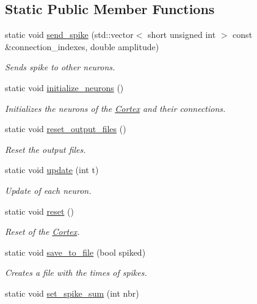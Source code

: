 \subsection*{Static Public Member Functions}
\begin{DoxyCompactItemize}
\item 
static void \hyperlink{class_cortex_a4e5948e42a6ecb67983d235601ae8a61}{send\+\_\+spike} (std\+::vector$<$ short unsigned int $>$ const \&connection\+\_\+indexes, double amplitude)
\begin{DoxyCompactList}\small\item\em Sends spike to other neurons. \end{DoxyCompactList}\item 
static void \hyperlink{class_cortex_a4170f4ee3970170f0390bb484e4639d0}{initialize\+\_\+neurons} ()
\begin{DoxyCompactList}\small\item\em Initializes the neurons of the \hyperlink{class_cortex}{Cortex} and their connections. \end{DoxyCompactList}\item 
static void \hyperlink{class_cortex_ab6d894473b90db185847264480cc3b4d}{reset\+\_\+output\+\_\+files} ()
\begin{DoxyCompactList}\small\item\em Reset the output files. \end{DoxyCompactList}\item 
static void \hyperlink{class_cortex_a9c30099b98098f2dd3b9d2aa215ca619}{update} (int t)
\begin{DoxyCompactList}\small\item\em Update of each neuron. \end{DoxyCompactList}\item 
static void \hyperlink{class_cortex_ac87b3cbab02738737df2f556e147a294}{reset} ()
\begin{DoxyCompactList}\small\item\em Reset of the \hyperlink{class_cortex}{Cortex}. \end{DoxyCompactList}\item 
static void \hyperlink{class_cortex_acb97b9bb95b16d0dd055c94d540e1983}{save\+\_\+to\+\_\+file} (bool spiked)
\begin{DoxyCompactList}\small\item\em Creates a file with the times of spikes. \end{DoxyCompactList}\item 
static void \hyperlink{class_cortex_a477c9c5be335228690ab2c42914e73c0}{set\+\_\+spike\+\_\+sum} (int nbr)

\end{DoxyCompactItemize}
